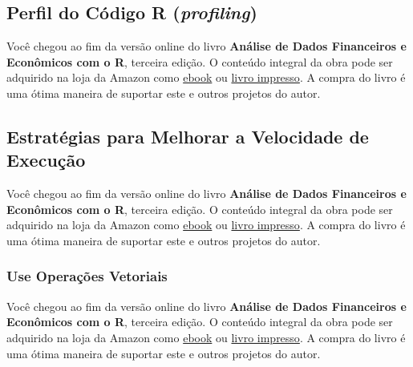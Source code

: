 \documentclass[
  11pt,
]{book}
\newenvironment{pleasebuyit}
{\begin{noteblock}
		
	} {\end{noteblock}}
\begin{document}
\hypertarget{perfil-do-cuxf3digo-r-profiling}{%
\subsection{\texorpdfstring{Perfil do Código R (\emph{profiling})}{Perfil do Código R (profiling)}}\label{perfil-do-cuxf3digo-r-profiling}}

\begin{pleasebuyit}
Você chegou ao fim da versão online do livro \textbf{Análise de Dados
Financeiros e Econômicos com o R}, terceira edição. O conteúdo integral
da obra pode ser adquirido na loja da Amazon como
\href{https://www.amazon.com.br/dp/B08WNC27ZY}{ebook} ou
\href{https://www.amazon.com/dp/B08WP8CCDB}{livro impresso}. A compra do
livro é uma ótima maneira de suportar este e outros projetos do autor.
\end{pleasebuyit}

\hypertarget{estratuxe9gias-para-melhorar-a-velocidade-de-execuuxe7uxe3o}{%
\subsection{Estratégias para Melhorar a Velocidade de Execução}\label{estratuxe9gias-para-melhorar-a-velocidade-de-execuuxe7uxe3o}}

\begin{pleasebuyit}
Você chegou ao fim da versão online do livro \textbf{Análise de Dados
Financeiros e Econômicos com o R}, terceira edição. O conteúdo integral
da obra pode ser adquirido na loja da Amazon como
\href{https://www.amazon.com.br/dp/B08WNC27ZY}{ebook} ou
\href{https://www.amazon.com/dp/B08WP8CCDB}{livro impresso}. A compra do
livro é uma ótima maneira de suportar este e outros projetos do autor.
\end{pleasebuyit}

\hypertarget{use-operauxe7uxf5es-vetoriais}{%
\subsubsection{Use Operações Vetoriais}\label{use-operauxe7uxf5es-vetoriais}}

\begin{pleasebuyit}
Você chegou ao fim da versão online do livro \textbf{Análise de Dados
Financeiros e Econômicos com o R}, terceira edição. O conteúdo integral
da obra pode ser adquirido na loja da Amazon como
\href{https://www.amazon.com.br/dp/B08WNC27ZY}{ebook} ou
\href{https://www.amazon.com/dp/B08WP8CCDB}{livro impresso}. A compra do
livro é uma ótima maneira de suportar este e outros projetos do autor.
\end{pleasebuyit}
\end{document}
